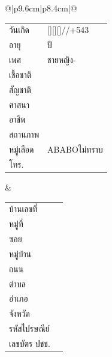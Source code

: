 \documentclass[12pt]{article}
\newcommand{\bedate}[1]{\StrLeft{#1}{4}[\yy]\StrMid{#1}{6}{7}[\mm]\StrMid{#1}{9}{10}[\dd]\dd/\mm/\the\numexpr\yy+543\relax}
\begin{document}
\renewcommand{\arraystretch}{1.3}
\begin{tabular}{@{}|p{9.6cm}|p{8.4cm}|@{}}\hline
{}\\ \hline
\begin{tabular}[t]{@{}ll@{}}
 วันเกิด & \bedate{\VAR{birth_date}}\\ อายุ & \VAR{age} ปี\\
 เพศ & \BLOCK{if p_gender=='1'}ชาย\BLOCK{elif p_gender=='2'}หญิง\BLOCK{else}-\BLOCK{endif}\\
 เชื้อชาติ & \VAR{race}\\ สัญชาติ & \VAR{nation}\\ ศาสนา & \VAR{religion}\\
 อาชีพ & \VAR{occupation}\\ สถานภาพ & \VAR{mstatus}\\
 หมู่เลือด & \BLOCK{if p_abogroup=='1'}A\BLOCK{elif p_abogroup=='2'}B\BLOCK{elif p_abogroup=='3'}AB\BLOCK{elif p_abogroup=='4'}O\BLOCK{else}ไม่ทราบ\BLOCK{endif}\\
 โทร. & \VAR{p_phone}\\
\end{tabular}
&
\begin{tabular}[t]{@{}ll@{}}
 บ้านเลขที่ & \VAR{now_house}\\ หมู่ที่ & \VAR{now_moo}\\ ซอย & \VAR{now_lane}\\
 หมู่บ้าน & \VAR{now_village}\\ ถนน & \VAR{now_road}\\ ตำบล & \VAR{tambon}\\
 อำเภอ & \VAR{amphur}\\ จังหวัด & \VAR{province}\\ รหัสไปรษณีย์ & \VAR{now_zipcode}\\
 เลขบัตร ปชช. & \VAR{p_cid}\\
\end{tabular}\\ \hline
{}\\ \hline
{}\\ \hline
\end{tabular}
\end{document}
